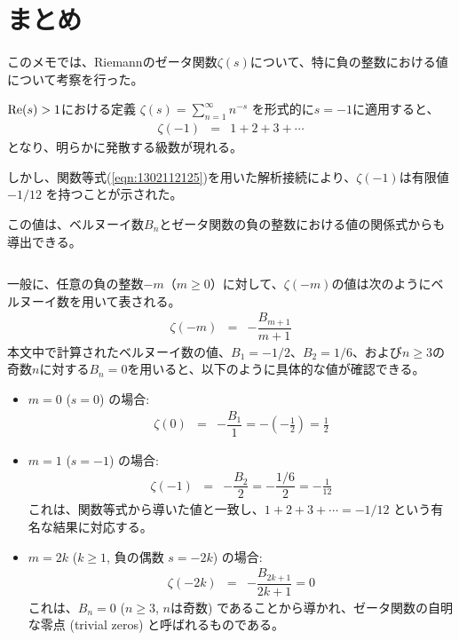 \documentclass[uplatex,a4j,12pt,dvipdfmx]{jsarticle}
\begin{document}
\section{まとめ}

このメモでは、Riemannのゼータ関数$\zeta(s)$について、特に負の整数における値について考察を行った。

${\rm Re}(s) > 1$における定義 $\zeta(s) = \sum_{n=1}^{\infty} n^{-s}$ を形式的に$s=-1$に適用すると、
\begin{eqnarray}
	\zeta(-1)
	&=&
	1+2+3+\cdots
\end{eqnarray}
となり、明らかに発散する級数が現れる。

しかし、関数等式(\ref{eqn:1302112125})を用いた解析接続により、$\zeta(-1)$は有限値 $-1/12$ を持つことが示された。

この値は、ベルヌーイ数$B_n$とゼータ関数の負の整数における値の関係式からも導出できる。

${}$

一般に、任意の負の整数$-m$（$m \ge 0$）に対して、$\zeta(-m)$の値は次のようにベルヌーイ数を用いて表される。
\begin{eqnarray}
	\zeta(-m)
	&=&
	-
	\dfrac{B_{m+1}}{m+1}
\end{eqnarray}
本文中で計算されたベルヌーイ数の値、$B_1 = -1/2$、$B_2 = 1/6$、および$n \ge 3$の奇数$n$に対する$B_n = 0$を用いると、以下のように具体的な値が確認できる。

\begin{itemize}
	\item $m=0$ ($s=0$) の場合:
	      \begin{eqnarray}
		      \zeta(0)
		      &=&
		      -
		      \dfrac{B_{1}}{1}
		      =
		      - \left( - \frac{1}{2} \right)
		      =
		      \frac{1}{2}
	      \end{eqnarray}

	\item $m=1$ ($s=-1$) の場合:
	      \begin{eqnarray}
		      \zeta(-1)
		      &=&
		      -
		      \dfrac{B_{2}}{2}
		      =
		      - \dfrac{1/6}{2}
		      =
		      - \frac{1}{12}
	      \end{eqnarray}
	      これは、関数等式から導いた値と一致し、$1+2+3+\cdots = -1/12$ という有名な結果に対応する。

	\item $m=2k$ ($k \ge 1$, 負の偶数 $s=-2k$) の場合:
	      \begin{eqnarray}
		      \zeta(-2k)
		      &=&
		      -
		      \dfrac{B_{2k+1}}{2k+1}
		      =
		      0
	      \end{eqnarray}
	      これは、$B_n=0$ ($n \ge 3$, $n$は奇数) であることから導かれ、ゼータ関数の自明な零点 (trivial zeros) と呼ばれるものである。
\end{itemize}
\end{document}
